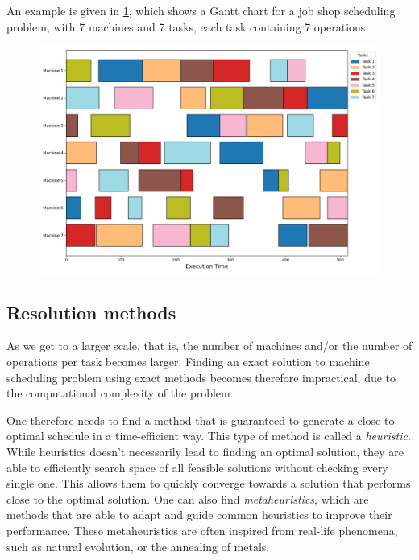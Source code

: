 \documentclass{mimosis}
\begin{document}
An example is given in \cref{fig:7_7-JSSP-Gantt}, which shows a Gantt chart for a job shop scheduling problem, with 7 machines and 7 tasks, each task containing 7 operations.

\begin{figure}[H]
\includegraphics[width=15cm]{7_7-test_0.0_1.png} %
\centering
{}
\label{fig:7_7-JSSP-Gantt}
\end{figure}

\subsection{Resolution methods}
As we get to a larger scale, that is, the number of machines and/or the number of operations per task becomes larger. Finding an exact solution to machine scheduling problem using exact methods becomes therefore impractical, due to the computational complexity of the problem. 

One therefore needs to find a method that is guaranteed to generate a close-to-optimal schedule in a time-efficient way. This type of method is called a \emph{heuristic}. While heuristics doesn't necessarily lead to finding an optimal solution, they are able to efficiently search space of all feasible solutions without checking every single one. This allows them to quickly converge towards a solution that performs close to the optimal solution. One can also find \emph{metaheuristics}, which are methods that are able to adapt and guide common heuristics to improve their performance. These metaheuristics are often inspired from real-life phenomena, such as natural evolution, or the annealing of metals.
\end{document}
